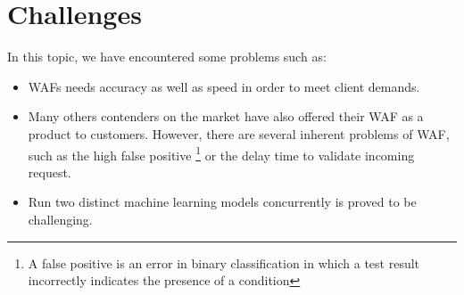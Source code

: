 \section{Challenges}
\label{sec:challenges}
In this topic, we have encountered some problems such as:
\begin{itemize}
    \item WAFs needs accuracy as well as speed in order to meet client demands.
    \item Many others contenders on the market have also offered their WAF as a product to customers. However, there are several inherent problems of WAF, such as the high false positive \footnote{A false positive is an error in binary classification in which a test result incorrectly indicates the presence of a condition} or the delay time to validate incoming request.
    \item Run two distinct machine learning models concurrently is proved to be challenging.
\end{itemize}
